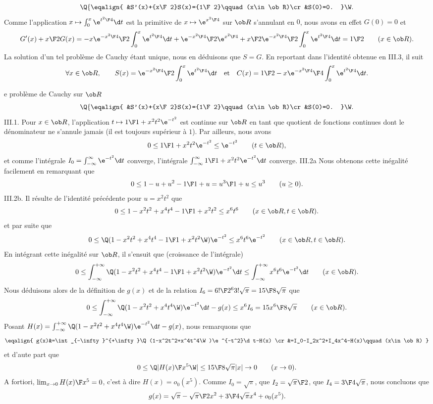 $$
\Q\{
	\eqalign{
		&S'(x)+{x\F 2}S(x)={1\F 2}\qquad (x\in\ob R)\cr
		&S(0)=0.
	}	
\W.
$$
Comme l'application $x\mapsto\int_0^x\e^{t^2\F 4}\d t$ est la primitive de $x\mapsto\e^{x^2\F 4}$ sur $\ob R$ s'annulant en $0$, nous avons en effet $G(0)=0$ et 
$$
G'(x)+{x\F 2}G(x)= -x{\e^{-x^2\F 4}\F 2}\int_0^x\e^{t^2\F 4}\d t+ {\e^{-x^2\F 4}\F 2}\e^{x^2\F 4}+{x\F 2} {\e^{-x^2\F 4}\F 2}\int_0^x\e^{t^2\F 4}\d t={1\F 2}\qquad (x\in\ob R).
$$
La solution d'un tel probl\`eme de Cauchy \'etant unique, nous en d\'eduisons que $S=G$. En reportant dans l'identit\'e obtenue en III.3, il suit 
$$
\forall x\in\ob R, \qquad S(x)={\e^{-x^2\F 4}\F 2}\int_0^x\e^{t^2\F 4}\d t\quad\hbox{et}\quad C(x)={1\F2}-x{\e^{-x^2\F 4}\F 4}\int_0^x\e^{t^2\F 4}\d t.
$$


e probl\`eme de Cauchy sur $\ob R$
$$
\Q\{
	\eqalign{
		&S'(x)+{x\F 2}S(x)={1\F 2}\qquad (x\in\ob R)\cr
		&S(0)=0.
	}	
\W.
$$
III.1. Pour $x\in\ob R$, l'application $t\mapsto{1\F 1+x^2t^2}\e^{-t^2}$ est continue sur $\ob R$ en tant que quotient de fonctions continues dont le d\'enominateur ne s'annule jamais (il est toujours sup\'erieur \`a $1$). Par ailleurs, nous avons 
$$
0\le {1\F 1+x^2t^2}\e^{-t^2}\le \e^{-t^2}\qquad (t\in\ob R),
$$
et comme l'int\'egrale $I_0=\int_{-\infty}^{\infty}\e^{-t^2}\d t$ converge, l'int\'egrale $\int_{-\infty}^{\infty}{1\F 1+x^2t^2}\e^{-t^2}\d t$ converge.
\medskip\noindent
III.2a Nous obtenons cette in\'egalit\'e facilement en remarquant que  
$$
0\le 1-u+u^2-{1\F 1+u}={u^3\F 1+u}\le u^3\qquad (u\ge0). 
$$
III.2b. Il r\'esulte de l'identit\'e pr\'ec\'edente pour $u=x^2t^2$ que 
$$
0\le 1-x^2t^2+x^4t^4-{1\F 1+x^2t^2}\le x^6t^6\qquad (x\in\ob R,t\in\ob R). 
$$
et par suite que 
$$
0\le \Q(1-x^2t^2+x^4t^4-{1\F 1+x^2t^2}\W)\e^{-t^2}\le x^6t^6\e^{-t^2}\qquad (x\in\ob R,t\in\ob R). 
$$
En int\'egrant cette in\'egalit\'e sur $\ob R$, il s'ensuit que (croissance de l'int\'egrale)
$$
0\le\int_{-\infty}^{+\infty}\Q(1-x^2t^2+x^4t^4-{1\F 1+x^2t^2}\W)\e^{-t^2}\d t \le \int_{-\infty}^{+\infty}x^6t^6\e^{-t^2}\d t\qquad(x\in\ob R).
$$
Nous d\'eduisons alors de la d\'efinition de $g(x)$ et de la relation $I_6={6!\F 2^63!}\sqrt\pi={15\F 8}\sqrt\pi$ que  
$$
0\le\int_{-\infty}^{+\infty}\Q(1-x^2t^2+x^4t^4\W)\e^{-t^2}\d t-g(x)\le x^6I_6={15x^6\F 8}\sqrt\pi\qquad(x\in\ob R).
$$
Posant $H(x)=\int_{-\infty}^{+\infty}\Q(1-x^2t^2+x^4t^4\W)\e^{-t^2}\d t-g(x)$, nous remarquons que 
$$
\eqalign{
g(x)&=\int_{-\infty}^{+\infty}\Q(1-x^2t^2+x^4t^4\W)\e^{-t^2}\d t-H(x)
\cr
&=I_0-I_2x^2+I_4x^4-H(x)\qquad(x\in\ob R)
}
$$
et d'aute part que 
$$
0\le \Q|{H(x)\F x^5}\W|\le {15\F 8}\sqrt\pi|x|\to 0\qquad (x\to 0).
$$
A fortiori, $\lim_{x\to 0} {H(x)\F x^5}=0$, c'est \`a dire $H(x)=o_0(x^5)$. Comme  $I_0=\sqrt\pi$, que $I_2={\sqrt\pi\F 2}$, que $I_4={3\F 4}\sqrt\pi$, nous concluons que 
$$
g(x)=\sqrt\pi-{\sqrt\pi\F 2}x^2+{3\F 4}\sqrt\pi x^4+o_0(x^5).
$$
\bye
